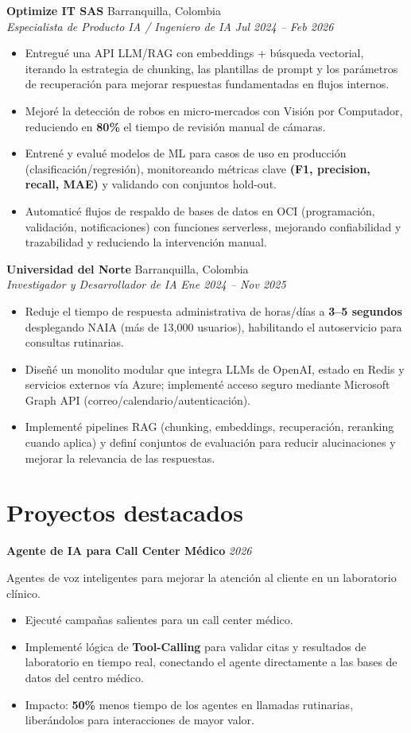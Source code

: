 \documentclass[letterpaper,10pt]{article}
\newcommand{\resumeItem}[1]{\item \small{#1}}
\newcommand{\resumeSubheading}[4]{%
  \textbf{#1} \hfill #2 \\
  \textit{\small #3} \hfill \textit{\small #4} \\
  \vspace{-2pt}
}
\newcommand{\resumeProject}[3]{%
  \par\noindent\textbf{#1} \hfill \textit{\small #2} \par
  \noindent\small #3 \par
}
\newcommand{\betweenRoles}{\vspace{4pt}}
\newcommand{\projectGap}{\vspace{6pt}}
\begin{document}
\resumeSubheading
{Optimize IT SAS}{Barranquilla, Colombia}
{Especialista de Producto IA / Ingeniero de IA}{Jul 2024 -- Feb 2026}
\begin{itemize}
  \resumeItem{Entregué una API LLM/RAG con embeddings + búsqueda vectorial, iterando la estrategia de chunking, las plantillas de prompt y los parámetros de recuperación para mejorar respuestas fundamentadas en flujos internos.}
  \resumeItem{Mejoré la detección de robos en micro-mercados con Visión por Computador, reduciendo en \textbf{80\%} el tiempo de revisión manual de cámaras.}
  \resumeItem{Entrené y evalué modelos de ML para casos de uso en producción (clasificación/regresión), monitoreando métricas clave \textbf{(F1, precision, recall, MAE)} y validando con conjuntos hold-out.}
  \resumeItem{Automaticé flujos de respaldo de bases de datos en OCI (programación, validación, notificaciones) con funciones serverless, mejorando confiabilidad y trazabilidad y reduciendo la intervención manual.}
\end{itemize}
\betweenRoles

\resumeSubheading
{Universidad del Norte}{Barranquilla, Colombia}
{Investigador y Desarrollador de IA}{Ene 2024 -- Nov 2025}
\begin{itemize}
  \resumeItem{Reduje el tiempo de respuesta administrativa de horas/días a \textbf{3--5 segundos} desplegando NAIA (más de 13{,}000 usuarios), habilitando el autoservicio para consultas rutinarias.}
  \resumeItem{Diseñé un monolito modular que integra LLMs de OpenAI, estado en Redis y servicios externos vía Azure; implementé acceso seguro mediante Microsoft Graph API (correo/calendario/autenticación).}
  \resumeItem{Implementé pipelines RAG (chunking, embeddings, recuperación, reranking cuando aplica) y definí conjuntos de evaluación para reducir alucinaciones y mejorar la relevancia de las respuestas.}
\end{itemize}

\section{Proyectos destacados}

\resumeProject
{Agente de IA para Call Center Médico}{2026}
{Agentes de voz inteligentes para mejorar la atención al cliente en un laboratorio clínico.}
\begin{itemize}
  \resumeItem{Ejecuté campañas salientes para un call center médico.}
  \resumeItem{Implementé lógica de \textbf{Tool-Calling} para validar citas y resultados de laboratorio en tiempo real, conectando el agente directamente a las bases de datos del centro médico.}
  \resumeItem{Impacto: \textbf{50\%} menos tiempo de los agentes en llamadas rutinarias, liberándolos para interacciones de mayor valor.}
\end{itemize}
\projectGap
\end{document}
